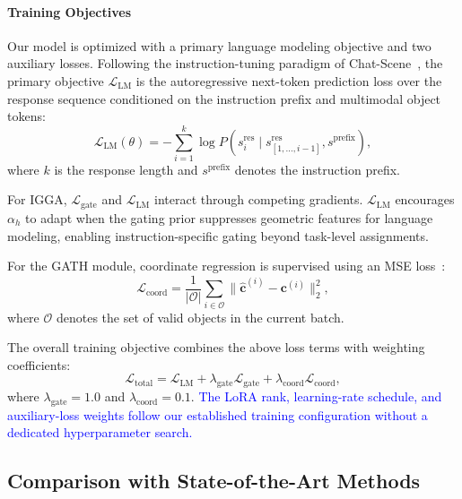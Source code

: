 \documentclass[lettersize,journal]{IEEEtran}
\begin{document}
\paragraph*{Training Objectives}
Our model is optimized with a primary language modeling objective and two auxiliary losses. Following the instruction-tuning paradigm of Chat-Scene~\cite{chatscene2024}, the primary objective $\mathcal{L}_{\text{LM}}$ is the autoregressive next-token prediction loss over the response sequence conditioned on the instruction prefix and multimodal object tokens:
\begin{equation}
\mathcal{L}_{\text{LM}}(\theta) = -\sum_{i=1}^{k} \log P\left(s_i^{\text{res}} \mid s_{[1,\dots,i-1]}^{\text{res}}, s^{\text{prefix}}\right),
\end{equation}
where $k$ is the response length and $s^{\text{prefix}}$ denotes the instruction prefix.

For IGGA, $\mathcal{L}_{\text{gate}}$ and $\mathcal{L}_{\text{LM}}$ interact through competing gradients. $\mathcal{L}_{\text{LM}}$ encourages $\alpha_h$ to adapt when the gating prior suppresses geometric features for language modeling, enabling instruction-specific gating beyond task-level assignments.

For the GATH module, coordinate regression is supervised using an {MSE} loss~\cite{mseloss}:
\begin{equation}
\mathcal{L}_{\text{coord}} = \frac{1}{|\mathcal{O}|} \sum_{i \in \mathcal{O}} \|\hat{\mathbf{c}}^{(i)} - \mathbf{c}^{(i)}\|_2^2,
\end{equation}
where $\mathcal{O}$ denotes {the set of} valid objects in the current batch.

The overall training objective combines the above loss terms with weighting coefficients:
\begin{equation}
\mathcal{L}_{\text{total}} = \mathcal{L}_{\text{LM}} + \lambda_{\text{gate}} \mathcal{L}_{\text{gate}} + \lambda_{\text{coord}} \mathcal{L}_{\text{coord}},
\end{equation}
where $\lambda_{\text{gate}}=1.0$ and $\lambda_{\text{coord}}=0.1$. \textcolor{blue}{The LoRA rank, learning-rate schedule, and auxiliary-loss weights follow our established training configuration without a dedicated hyperparameter search.}

\subsection{Comparison with State-of-the-Art Methods}
\end{document}
